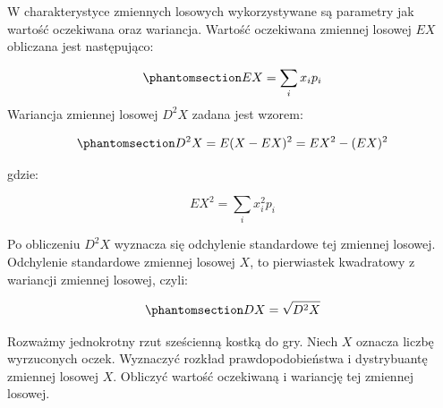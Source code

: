 \documentclass[
  letterpaper,
  DIV=11,
  numbers=noendperiod]{scrreprt}
\begin{document}
W charakterystyce zmiennych losowych wykorzystywane są parametry jak
wartość oczekiwana oraz wariancja. Wartość oczekiwana zmiennej losowej
\(EX\) obliczana jest następująco:

\begin{equation}\phantomsection\label{eq-wo_sk}{EX = \sum_{i}{x_ip_i}}\end{equation}
Wariancja zmiennej losowej \(D^2X\) zadana jest wzorem:

\begin{equation}\phantomsection\label{eq-war_sk}{D^2X = E(X-EX)^2 = EX^2-(EX)^2}\end{equation}

gdzie:

\[ EX^2 = \sum_{i}{x_i^2p_i}\]

Po obliczeniu \(D^2X\) wyznacza się odchylenie standardowe tej zmiennej
losowej. Odchylenie standardowe zmiennej losowej \(X\), to pierwiastek
kwadratowy z wariancji zmiennej losowej, czyli:

\begin{equation}\phantomsection\label{eq-sd_sk}{ DX=\sqrt{D^2X}}\end{equation}

\begin{tcolorbox}[enhanced jigsaw, toprule=.15mm, title=\textcolor{quarto-callout-tip-color}{\faLightbulb}\hspace{0.5em}{Przykład 4.1. Jednokrotny rzut sześcienną kostką do gry}, breakable, coltitle=black, titlerule=0mm, colbacktitle=quarto-callout-tip-color!10!white, opacitybacktitle=0.6, opacityback=0, bottomtitle=1mm, left=2mm, arc=.35mm, leftrule=.75mm, bottomrule=.15mm, rightrule=.15mm, toptitle=1mm, colframe=quarto-callout-tip-color-frame, colback=white]

\end{tcolorbox}

Rozważmy jednokrotny rzut sześcienną kostką do gry. Niech \(X\) oznacza
liczbę wyrzuconych oczek. Wyznaczyć rozkład prawdopodobieństwa i
dystrybuantę zmiennej losowej \(X\). Obliczyć wartość oczekiwaną i
wariancję tej zmiennej losowej.

\begin{tcolorbox}[enhanced jigsaw, toprule=.15mm, title={Rozwiązanie}, breakable, coltitle=black, titlerule=0mm, colbacktitle=quarto-callout-tip-color!10!white, opacitybacktitle=0.6, opacityback=0, bottomtitle=1mm, left=2mm, arc=.35mm, leftrule=.75mm, bottomrule=.15mm, rightrule=.15mm, toptitle=1mm, colframe=quarto-callout-tip-color-frame, colback=white]

\end{tcolorbox}
\end{document}
